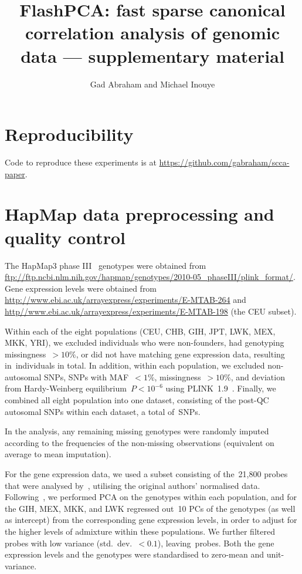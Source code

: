 \documentclass[a4paper,10pt]{scrartcl}
\author{Gad Abraham and Michael Inouye}
\title{FlashPCA: fast sparse canonical correlation analysis of genomic data
--- supplementary material}
\begin{document}
\maketitle

\section{Reproducibility}

Code to reproduce these experiments is at
\url{https://github.com/gabraham/scca-paper}.

\section{HapMap data preprocessing and quality control}

The HapMap3 phase III~\citep{hapmap2010} genotypes were obtained from
\url{ftp://ftp.ncbi.nlm.nih.gov/hapmap/genotypes/2010-05_phaseIII/plink_format/}.
Gene expression levels were obtained from
\url{http://www.ebi.ac.uk/arrayexpress/experiments/E-MTAB-264} and
\url{http//www.ebi.ac.uk/arrayexpress/experiments/E-MTAB-198} (the CEU subset).

Within each of the eight populations (CEU, CHB, GIH, JPT, LWK, MEX,
MKK, YRI), we excluded individuals who were non-founders, had genotyping
missingness~${>}10\%$, or did not have matching gene expression data, resulting
in~\nindiv individuals in total. In addition, within each population, we
excluded non-autosomal SNPs, SNPs with MAF~${<}1\%$, missingness~${>}10\%$,
and deviation from Hardy-Weinberg equilibrium~$P{<}10^{-6}$ using
PLINK~1.9~\citep{purcell2007,Chang2015}.  Finally, we combined all eight
population into one dataset, consisting of the post-QC autosomal SNPs within
each dataset, a total of~\nsnps SNPs.

In the analysis, any remaining missing genotypes were randomly imputed
according to the frequencies of the non-missing observations (equivalent on
average to mean imputation).

For the gene expression data, we used a subset consisting of the~21,800 probes
that were analysed by~\citep{Stranger2012}, utilising the original authors'
normalised data. Following~\citep{Stranger2012}, we performed PCA on the
genotypes within each population, and for the GIH, MEX, MKK, and LWK regressed
out~10 PCs of the genotypes (as well as intercept) from the corresponding gene
expression levels, in order to adjust for the higher levels of admixture within
these populations.  We further filtered probes with low variance
(std.~dev.~${<}0.1$), leaving~\ngenes probes. Both the gene expression levels and
the genotypes were standardised to zero-mean and unit-variance.
\end{document}
